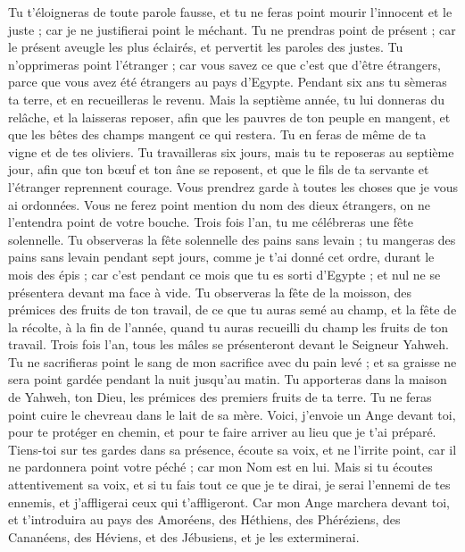 \begin{multicols}{2}
Tu t'éloigneras de toute parole fausse, et tu ne feras point mourir l'innocent et le juste ; car je ne justifierai point le méchant.
Tu ne prendras point de présent ; car le présent aveugle les plus éclairés, et pervertit les paroles des justes.
Tu n'opprimeras point l'étranger ; car vous savez ce que c'est que d'être étrangers, parce que vous avez été étrangers au pays d'Egypte.
Pendant six ans tu sèmeras ta terre, et en recueilleras le revenu.
Mais la septième année, tu lui donneras du relâche, et la laisseras reposer, afin que les pauvres de ton peuple en mangent, et que les bêtes des champs mangent ce qui restera. Tu en feras de même de ta vigne et de tes oliviers.
Tu travailleras six jours, mais tu te reposeras au septième jour, afin que ton bœuf et ton âne se reposent, et que le fils de ta servante et l'étranger reprennent courage.
Vous prendrez garde à toutes les choses que je vous ai ordonnées. Vous ne ferez point mention du nom des dieux étrangers, on ne l'entendra point de votre bouche\FTNT{}.
Trois fois l'an, tu me célébreras une fête solennelle\FTNT{}.
Tu observeras la fête solennelle des pains sans levain\FTNT{} ; tu mangeras des pains sans levain pendant sept jours, comme je t'ai donné cet ordre, durant le mois des épis ; car c’est pendant ce mois que tu es sorti d'Egypte ; et nul ne se présentera devant ma face à vide.
Tu observeras la fête de la moisson, des prémices des fruits de ton travail, de ce que tu auras semé au champ, et la fête de la récolte, à la fin de l'année, quand tu auras recueilli du champ les fruits de ton travail\FTNT{}.
Trois fois l'an, tous les mâles se présenteront devant le Seigneur Yahweh.
Tu ne sacrifieras point le sang de mon sacrifice avec du pain levé ; et sa graisse ne sera point gardée pendant la nuit jusqu’au matin\FTNT{}.
Tu apporteras dans la maison de Yahweh, ton Dieu, les prémices des premiers fruits de ta terre. Tu ne feras point cuire le chevreau dans le lait de sa mère.
Voici, j'envoie un Ange devant toi, pour te protéger en chemin, et pour te faire arriver au lieu que je t'ai préparé.
Tiens-toi sur tes gardes dans sa présence, écoute sa voix, et ne l'irrite point, car il ne pardonnera point votre péché ; car mon Nom est en lui.
Mais si tu écoutes attentivement sa voix, et si tu fais tout ce que je te dirai, je serai l'ennemi de tes ennemis, et j'affligerai ceux qui t'affligeront.
Car mon Ange marchera devant toi, et t'introduira au pays des Amoréens, des Héthiens, des Phéréziens, des Cananéens, des Héviens, et des Jébusiens, et je les exterminerai.

\end{multicols}
